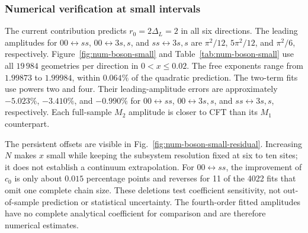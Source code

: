 \documentclass[11pt]{article}
\begin{document}
\subsubsection{Numerical verification at small intervals}
\label{sec:num-boson-small}
The current contribution predicts $r_0=2\Delta_L=2$ in all six directions.
The leading amplitudes for $00\leftrightarrow ss$,
$00\leftrightarrow3s,s$, and $ss\leftrightarrow3s,s$ are
$\pi^2/12$, $5\pi^2/12$, and $\pi^2/6$, respectively.
Figure~\ref{fig:num-boson-small} and
Table~\ref{tab:num-boson-small} use all $19\,984$ geometries per
direction in $0<x\leq0.02$. The free exponents range from
$1.99873$ to $1.99984$, within $0.064\%$ of the quadratic prediction.
The two-term fits use powers two and four. Their leading-amplitude
errors are approximately $-5.023\%$, $-3.410\%$, and $-0.990\%$
for $00\leftrightarrow ss$, $00\leftrightarrow3s,s$, and
$ss\leftrightarrow3s,s$, respectively. Each full-sample $M_2$
amplitude is closer to CFT than its $M_1$ counterpart.

The persistent offsets are visible in
Fig.~\ref{fig:num-boson-small-residual}. Increasing $N$ makes $x$
small while keeping the subsystem resolution fixed at six to ten
sites; it does not establish a continuum extrapolation. For
$00\leftrightarrow ss$, the improvement of $c_0$ is only about
$0.015$ percentage points and reverses for 11 of the 4022 fits
that omit one complete chain size. These deletions test coefficient
sensitivity, not out-of-sample prediction or statistical uncertainty.
The fourth-order fitted amplitudes have no complete analytical
coefficient for comparison and are therefore numerical estimates.
\end{document}
